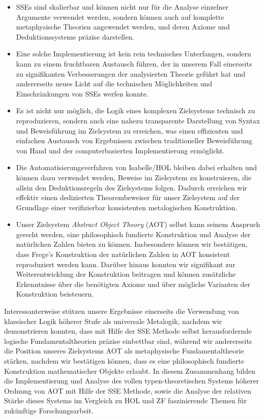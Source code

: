 \documentclass[a4paper,enabledeprecatedfontcommands,abstract=on,twoside=true]{scrreprt}
\numberwithin{TODO}{chapter}
\numberwithin{equation}{section}
\begin{document}
\begin{itemize}
\item SSEs sind skalierbar und k\"onnen nicht nur für die Analyse einzelner Argumente verwendet werden, sondern k\"onnen auch auf komplette metaphysische Theorien angewendet werden, und deren Axiome und Deduktionssysteme pr\"azise darstellen.
\item Eine solche Implementierung ist kein rein technisches Unterfangen, sondern kann zu einem fruchtbaren Austausch f\"uhren, der in unserem Fall einerseits zu signifikanten Verbesserungen der analysierten Theorie gef\"uhrt hat und andererseits neues Licht auf die technischen Möglichkeiten und Einschränkungen von SSEs werfen konnte.
\item Es ist nicht nur möglich, die Logik eines komplexen Zielsystems technisch zu reproduzieren, sondern auch eine nahezu transparente Darstellung von Syntax und Beweisf\"uhrung im Zielsystem zu erreichen, was einen effizienten und einfachen Austausch von Ergebnissen zwischen traditioneller Beweisf\"uhrung von Hand und der computerbasierten Implementierung ermöglicht.
\item Die Automatisierungsverfahren von Isabelle/HOL bleiben dabei erhalten und können dazu verwendet werden, Beweise im Zielsystem zu konstruieren, die allein den Deduktionsregeln des Zielsystems folgen. Dadurch erreichen wir effektiv einen dedizierten Theorembeweiser für unser Zielsystem auf der Grundlage einer verifizierbar konsistenten metalogischen Konstruktion.
\item Unser Zielsystem \emph{Abstract Object Theory} (AOT) selbst kann seinem Anspruch gerecht werden, eine philosophisch fundierte Konstruktion und Analyse der nat\"urlichen Zahlen bieten zu k\"onnen. Insbesondere k\"onnen wir bestätigen, dass Frege's Konstruktion der nat\"urlichen Zahlen in AOT konsistent reproduziert werden kann. Dar\"uber hinaus konnten wir signifikant zur Weiterentwicklung der Konstruktion beitragen und k\"onnen zusätzliche Erkenntnisse \"uber die ben\"otigten Axiome und \"uber m\"ogliche Varianten der Konstruktion beisteuern.
\end{itemize}

Interessanterweise stützen unsere Ergebnisse einerseits die Verwendung von klassischer Logik h\"oherer Stufe als universale Metalogik, nachdem wir demonstrieren konnten, dass mit Hilfe der SSE Methode selbst herausfordernde logische Fundamentaltheorien präzise einbettbar sind, während wir andererseits die Position unseres Zielsystems AOT als metaphysische Fundamentaltheorie st\"arken, nachdem wir best\"atigen k\"onnen, dass es eine philosophisch fundierte Konstruktion mathematischer Objekte erlaubt. In diesem Zusammenhang bilden die Implementierung und Analyse des vollen typen-theoretischen Systems h\"oherer Ordnung von AOT mit Hilfe der SSE Methode, sowie die Analyse der relativen St\"arke dieses Systems im Vergleich zu HOL und ZF faszinierende Themen f\"ur zuk\"unftige Forschungsarbeit.
\end{document}

